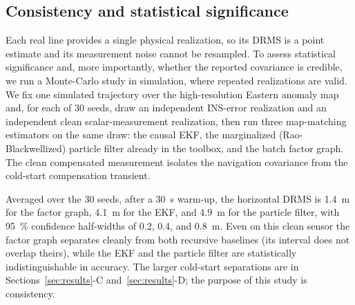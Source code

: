 \documentclass{IEEEtaes}
\begin{document}
\subsection{Consistency and statistical significance}
Each real line provides a single physical realization, so its DRMS is a point
estimate and its measurement noise cannot be resampled. To assess statistical
significance and, more importantly, whether the reported covariance is credible, we
run a Monte-Carlo study in simulation, where repeated realizations are valid. We fix
one simulated trajectory over the high-resolution Eastern anomaly map and, for each
of \num{30} seeds, draw an independent INS-error realization and an independent clean
scalar-measurement realization, then run three map-matching estimators on the same
draw: the causal EKF, the marginalized (Rao-Blackwellized) particle filter already
in the toolbox, and the batch factor graph. The clean compensated measurement
isolates the navigation covariance from the cold-start compensation transient.

Averaged over the \num{30} seeds, after a \SI{30}{\second} warm-up, the horizontal
DRMS is \SI{1.4}{\meter} for the factor graph, \SI{4.1}{\meter} for the EKF, and
\SI{4.9}{\meter} for the particle filter, with \SI{95}{\percent} confidence
half-widths of \num{0.2}, \num{0.4}, and \SI{0.8}{\meter}. Even on this clean
sensor the factor graph separates cleanly from both recursive baselines (its
interval does not overlap theirs), while the EKF and the particle filter are
statistically indistinguishable in accuracy. The larger cold-start separations are
in Sections~\ref{sec:results}-C and~\ref{sec:results}-D; the purpose of this study
is consistency.
\end{document}
